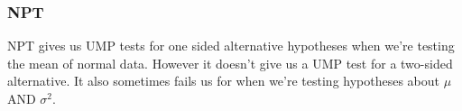 \documentclass{beamer}
\begin{document}
% 
% 
% 
% 
% 
% 
% 
\begin{frame}
\frametitle{NPT}

NPT gives us UMP tests for one sided alternative hypotheses when we're testing the mean of normal data. However it doesn't give us a UMP test for a two-sided alternative. It also sometimes fails us for when we're testing hypotheses about $\mu$ AND $\sigma^2$. 

\end{frame}
\end{document}
